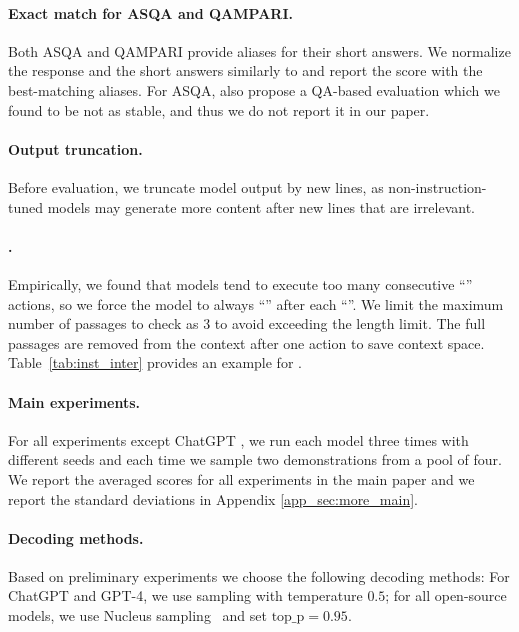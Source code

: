 \paragraph{Exact match for ASQA and QAMPARI.}
Both ASQA and QAMPARI provide aliases for their short answers. 
We normalize the response and the short answers similarly to \citet{rajpurkar-etal-2016-squad}
and report the score with the best-matching aliases. 
For ASQA, \citet{stelmakh2022asqa} also propose a QA-based evaluation which we found to be not as stable, and thus we do not report it in our paper.



\paragraph{Output truncation.} 
Before evaluation,
we truncate model output by new lines, 
as non-instruction-tuned models may generate more content after new lines that are irrelevant. 



\paragraph{\textbf{\textsc{\pinteract{}}}.} 
Empirically, we found that models tend to execute too many consecutive ``'' actions, so we force the model to always ``'' after each ``''. 
We limit the maximum number of passages to check as 3 to avoid exceeding the length limit.
The full passages are removed from the context after one action to save context space.
Table~\ref{tab:inst_inter} provides an example for \interact{}.

\paragraph{Main experiments.} 
For all experiments except ChatGPT \rerank{},
we run each model three times with different seeds and each time we sample two demonstrations from a pool of four.
We report the averaged scores for all experiments in the main paper 
and we report the standard deviations in Appendix \ref{app_sec:more_main}.

\paragraph{Decoding methods.}
Based on preliminary experiments we choose the following decoding methods: For ChatGPT and GPT-4, we use sampling with temperature $0.5$; for all open-source models, we use Nucleus sampling~\citep{Holtzman2020The} and set $\text{top\_p}=0.95$. 


